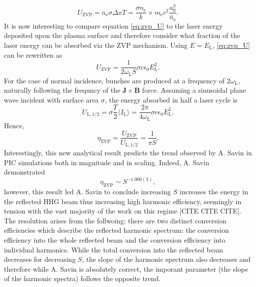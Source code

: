\begin{equation}\label{eq:zvp_U}
	U_\mathrm{ZVP} = n_\mathrm{e}\sigma\Delta x T = \frac{\sigma n_\mathrm{e}}{k}\times m_\mathrm{e}c^2 \frac{a^3_0}{\bar{n}_\mathrm{e}}.
\end{equation}
It is now interesting to compare equation \ref{eq:zvp_U} to the laser energy deposited upon the plasma surface and therefore consider what fraction of the laser energy can be absorbed via the \ac{ZVP} mechanism. Using $E = E_\mathrm{L}$, \ref{eq:zvp_U} can be rewritten as
\begin{equation}
	U_\mathrm{ZVP} = \frac{1}{2\omega_\mathrm{L} S}\sigma c \epsilon_0 E^2_\mathrm{L}.
\end{equation}
For the case of normal incidence, bunches are produced at a frequency of $2\omega_\mathrm{L}$, naturally following the frequncy of the $\mathbf{J}\times \mathbf{B}$ force. Assuming a sinusoidal plane wave incident with surface area $\sigma$, the energy absorbed in half a laser cycle is
\begin{equation}
	 U_\mathrm{L,1/2} = \sigma \frac{T}{2}\langle I_\mathrm{L}\rangle = \frac{2\pi}{4\omega_\mathrm{L}}\sigma c\epsilon_0E^2_\mathrm{L}.
\end{equation}
Hence,
\begin{equation}
	\eta_\mathrm{ZVP} = \frac{U_\mathrm{ZVP}}{U_\mathrm{L,1/2}} = \frac{1}{\pi S}.
\end{equation}
Interestingly, this new analytical result predicts the trend observed by A. Savin \cite{savinModellingLaserPlasmaInteractions2019} in \ac{PIC} simulations both in magnitude and in scaling. Indeed, A. Savin demonstrated 
\begin{equation}
	\eta_\mathrm{ZVP} \sim S^{-1.000(3)},
\end{equation}
however, this result led A. Savin to conclude increasing $S$ increases the energy in the reflected \ac{HHG} beam thus increasing high harmonic efficiency, seemingly in tension with the vast majority of the work on this regime [CITE CITE CITE]. The resolution arises from the follwoing: there are two distinct conversion efficiencies which describe the reflected harmonic spectrum: the conversion efficiency into the whole reflected beam and the conversion efficiency into individual harmonics. While the total conversion into the reflected beam decreases for decreasing $S$, the slope of the harmonic spectrum also decreases and therefore while A. Savin is absolutely correct, the imporant parameter (the slope of the harmonic spectra) follows the opposite trend.

